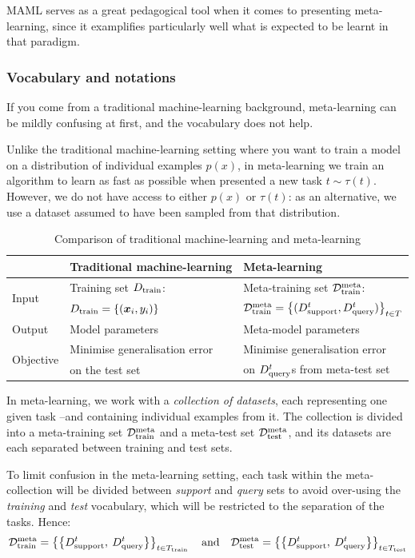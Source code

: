 \documentclass[11pt]{article}
\numberwithin{equation}{subsection}
\begin{document}
MAML serves as a great pedagogical tool when it comes to presenting meta-learning, since it examplifies particularly well what is expected to be learnt in that paradigm.


\subsubsection{Vocabulary and notations}

If you come from a traditional machine-learning background, meta-learning can be mildly confusing at first, and the vocabulary does not help.

Unlike the traditional machine-learning setting where you want to train a model on a distribution of individual examples $p(x)$, in meta-learning we train an algorithm to learn as fast as possible when presented a new task $t \sim \tau(t)$. However, we do not have access to either $p(x)$ or $\tau(t)$: as an alternative, we use a dataset assumed to have been sampled from that distribution.

\begin{table}[ht]
  \centering
  \begin{tabular}{@{}lll@{}}
    \toprule
    & Traditional machine-learning &  Meta-learning \\
    \toprule
    \multirow{2}{*}{Input} & Training set ${D_{\mathrm{train}}}$: &  Meta-training set ${\mathcal{D}_\mathrm{train}^\mathrm{meta}}$: \\
    & ${D_{\mathrm{train}}} = \left\{ ({\bm{x}}_i, y_i) \right\}$ & ${\mathcal{D}_\mathrm{train}^\mathrm{meta}} = \left\{ ({D_{\mathrm{support}}^t}, {D_{\mathrm{query}}^t}) \right\}_{t \in T}$ \\
    \midrule
    Output & Model parameters &  Meta-model parameters \\
    \midrule
    \multirow{2}{*}{Objective} & Minimise generalisation error &  Minimise generalisation error\\
    & on the test set & on ${D_{\mathrm{query}}^t}$s from meta-test set\\
    \bottomrule
  \end{tabular}
  \caption{Comparison of traditional machine-learning and meta-learning}
  \label{tab:metaml}
\end{table}

In meta-learning, we work with a \textit{collection of datasets}, each representing one given task –and containing individual examples from it. The collection is divided into a meta-training set ${\mathcal{D}_\mathrm{train}^\mathrm{meta}}$ and a meta-test set ${\mathcal{D}_\mathrm{test}^\mathrm{meta}}$, and its datasets are each separated between training and test sets.

To limit confusion in the meta-learning setting, each task within the meta-collection will be divided between \textit{support} and \textit{query} sets to avoid over-using the \textit{training} and \textit{test} vocabulary, which will be restricted to the separation of the tasks.
Hence:
\begin{equation*}
  {\mathcal{D}_\mathrm{train}^\mathrm{meta}} = \left\{ \left\{ {D_{\mathrm{support}}^t}, \: {D_{\mathrm{query}}^t} \right\} \right\}_{t \in T_\text{train}} \quad \text{and} \quad
  {\mathcal{D}_\mathrm{test}^\mathrm{meta}} = \left\{ \left\{ {D_{\mathrm{support}}^t}, \: {D_{\mathrm{query}}^t} \right\} \right\}_{t \in T_\text{test}}
\end{equation*}
\end{document}
